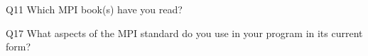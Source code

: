 \begin{description}%
\item{Q11} Which MPI book(s) have you read?%
\item{Q17} What aspects of the MPI standard do you use in your program in its current form?%
\end{description}%
